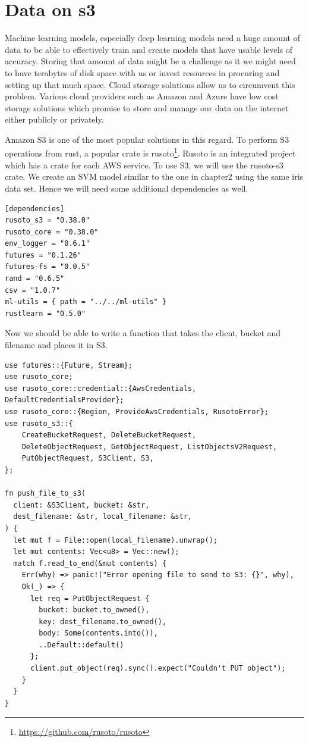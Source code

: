 \documentclass{book}
\begin{document}
\section{Data on s3}%
Machine learning models, especially deep learning models need a huge amount of data to be able to effectively train and create models that have usable levels of accuracy. Storing that amount of data might be a challenge as it we might need to have terabytes of disk space with us or invest resources in procuring and setting up that much space. Cloud storage solutions allow us to circumvent this problem. Various cloud providers such as Amazon and Azure have low cost storage solutions which promise to store and manage our data on the internet either publicly or privately.

Amazon S3 is one of the most popular solutions in this regard. To perform S3 operations from rust, a popular crate is rusoto\footnote{\href{github source code}{https://github.com/rusoto/rusoto}}. Rusoto is an integrated project which has a crate for each AWS service. To use S3, we will use the rusoto-s3 crate. We create an SVM model similar to the one in chapter2 using the same iris data set. Hence we will need some additional dependencies as well.

\begin{lstlisting}[caption={chapter4\\/working\_withi\_data\\/s3\_files\\/Cargo\\.toml},basicstyle=\small]
[dependencies]
rusoto_s3 = "0.38.0"
rusoto_core = "0.38.0"
env_logger = "0.6.1"
futures = "0.1.26"
futures-fs = "0.0.5"
rand = "0.6.5"
csv = "1.0.7"
ml-utils = { path = "../../ml-utils" }
rustlearn = "0.5.0"
\end{lstlisting}

Now we should be able to write a function that takes the client, bucket and filename and places it in S3.

\begin{lstlisting}[caption={},basicstyle=\small]
use futures::{Future, Stream};
use rusoto_core;
use rusoto_core::credential::{AwsCredentials, DefaultCredentialsProvider};
use rusoto_core::{Region, ProvideAwsCredentials, RusotoError};
use rusoto_s3::{
    CreateBucketRequest, DeleteBucketRequest,
    DeleteObjectRequest, GetObjectRequest, ListObjectsV2Request,
    PutObjectRequest, S3Client, S3,
};

fn push_file_to_s3(
  client: &S3Client, bucket: &str,
  dest_filename: &str, local_filename: &str,
) {
  let mut f = File::open(local_filename).unwrap();
  let mut contents: Vec<u8> = Vec::new();
  match f.read_to_end(&mut contents) {
    Err(why) => panic!("Error opening file to send to S3: {}", why),
    Ok(_) => {
      let req = PutObjectRequest {
        bucket: bucket.to_owned(),
        key: dest_filename.to_owned(),
        body: Some(contents.into()),
        ..Default::default()
      };
      client.put_object(req).sync().expect("Couldn't PUT object");
    }
  }
}
\end{lstlisting}
\end{document}
